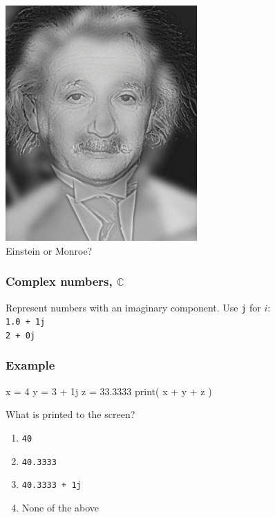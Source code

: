 \documentclass[11pt]{beamer}
\begin{document}
\begin{frame}
  \begin{center}
  \vspace{3mm}
  \includegraphics[width=0.55\textwidth]{./img/monroeeinstein.png}\\
  Einstein or Monroe?
  \end{center}
\end{frame}


\iffalse
\begin{frame}
  \frametitle{Complex numbers, $\mathbb{C}$}
  \Enlarge

  \begin{itemize}
  \myitem  Represent numbers with an imaginary component. \pause
  \myitem  Use \texttt{j} for $i$: \\
    \textcolor{CS101GradBot}{\texttt{1.0 + 1j}} \\
    \textcolor{CS101GradBot}{\texttt{2 + 0j}} 
  \end{itemize}
\end{frame}

\begin{frame}[fragile]
  \frametitle{Example}
  \Enlarge

  \begin{semiverbatim}
x = 4
y = 3 + 1j
z = 33.3333
print( x + y + z )
  \end{semiverbatim}
  What is printed to the screen?
  \begin{enumerate}[label=\Alph*]
  \item  \texttt{40}
  \item  \texttt{40.3333}
  \item  \texttt{40.3333 + 1j}
  \item  None of the above
  \end{enumerate}
\end{frame}
\end{document}
